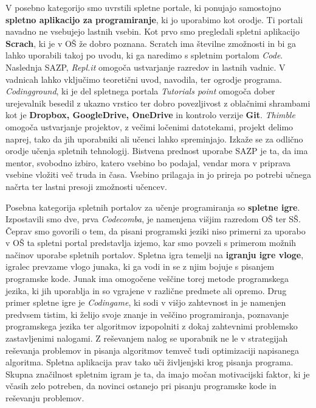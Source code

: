 V posebno kategorijo smo uvrstili spletne portale, ki ponujajo
samostojno \textbf{spletno aplikacijo za programiranje}, ki jo
uporabimo kot orodje. Ti portali navadno ne vsebujejo lastnih
vsebin. Kot prvo smo pregledali spletni aplikacijo \textbf{Scrach}, ki
je v OŠ že dobro poznana. Scratch ima številne zmožnosti in bi ga
lahko uporabili takoj po uvodu, ki ga naredimo s spletnim portalom
\emph{Code}. Naslednja SAZP, \emph{Repl.it} omogoča ustvarjanje
razredov in lastnih vadnic. V vadnicah lahko vključimo teoretični
uvod, navodila, ter ogrodje programa. \emph{Codingground}, ki je del
spletnega portala \emph{Tutorials point} omogoča dober urejevalnik
besedil z ukazno vrstico ter dobro povezljivost z oblačnimi shrambami
kot je \textbf{Dropbox, GoogleDrive, OneDrive} in kontrolo verzije
\textbf{Git}. \emph{Thimble} omogoča ustvarjanje projektov, z večimi
ločenimi datotekami, projekt delimo naprej, tako da jih uporabniki ali
učenci lahko spreminjajo. Izkaže se za odlično orodje učenja spletnih
tehnologij. Bistvena prednost uporabe SAZP je ta, da ima mentor,
svobodno izbiro, katero vsebino bo podajal, vendar mora v priprava
vsebine vložiti več truda in časa. Vsebino prilagaja in jo prireja po
potrebi učnega načrta ter lastni presoji zmožnosti učencev.

Posebna kategorija spletnih portalov za učenje programiranja so
\textbf{spletne igre}. Izpostavili smo dve, prva \emph{Codecomba}, je
namenjena višjim razredom OŠ ter SŠ. Čeprav smo govorili o tem, da
pisani programski jeziki niso primerni za uporabo v OŠ ta spletni
portal predstavlja izjemo, kar smo povzeli s primerom možnih načinov
uporabe spletnih portalov. Spletna igra temelji na \textbf{igranju
  igre vloge}, igralec prevzame vlogo junaka, ki ga vodi in se z njim
bojuje s pisanjem programske kode. Junak ima omogočene veščine torej
metode programskega jezika, ki jih uporablja in so vgrajene v različne
predmete ali opremo. Drug primer spletne igre je \emph{Codingame}, ki
sodi v višjo zahtevnost in je namenjen predvsem tistim, ki želijo
svoje znanje in veščino programiranja, poznavanje programskega jezika
ter algoritmov izpopolniti z dokaj zahtevnimi problemsko zastavljenimi
nalogami. Z reševanjem nalog se uporabnik ne le v strategijah
reševanja problemov in pisanja algoritmov temveč tudi optimizaciji
napisanega algoritma. Spletna aplikacija prav tako uči življenjski
krog pisanja programa. Skupna značilnost spletnim igram je ta, da
imajo močan motivacijski faktor, ki je včasih zelo potreben, da
novinci ostanejo pri pisanju programske kode in reševanju
problemov.

